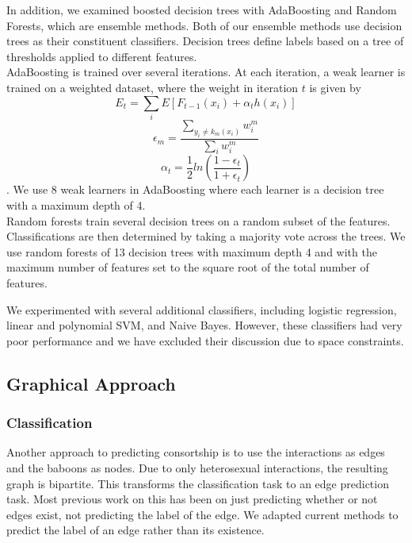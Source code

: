 \documentclass[twoside,twocolumn,paper=letter,fontsize=11pt]{article}
\begin{document}
In addition, we examined boosted decision trees with AdaBoosting and Random
Forests, which are ensemble methods. Both of our ensemble methods use decision
trees as their constituent classifiers. Decision trees define labels based on a
tree of thresholds applied to different features.\\

AdaBoosting is trained over several iterations. At each iteration, a weak
learner is trained on a weighted dataset, where the weight in iteration $t$ is
given by $$E_t=\sum_i E[F_{t-1}(x_i) + \alpha_t h(x_i)]$$
$$\epsilon_m = \frac{\sum_{y_i \ne k_m(x_i)} w_i^m}{\sum_i w_i^m}$$
$$\alpha_t=\frac{1}{2}ln(\frac{1-\epsilon_t}{1+\epsilon_t})$$. We use 8 weak learners in AdaBoosting
where each learner is a decision tree with a maximum depth of 4.\\

Random forests train several decision trees on a random subset of the features.
Classifications are then determined by taking a majority vote across the trees.
We use random forests of 13 decision trees with maximum depth 4 and with the
maximum number of features set to the square root of the total number of
features.

We experimented with several additional classifiers, including logistic
regression, linear and polynomial SVM, and Naive Bayes. However, these
classifiers had very poor performance and we have excluded their discussion due
to space constraints.

\subsection{Graphical Approach}

\subsubsection*{Classification}
Another approach to predicting consortship is to use the interactions as edges
and the baboons as nodes. Due to only heterosexual interactions, the resulting
graph is bipartite. This transforms the classification task to an edge
prediction task. Most previous work on this has been on just predicting whether
or not edges exist, not predicting the label of the edge. We adapted current
methods to predict the label of an edge rather than its existence.\\ 
\end{document}
